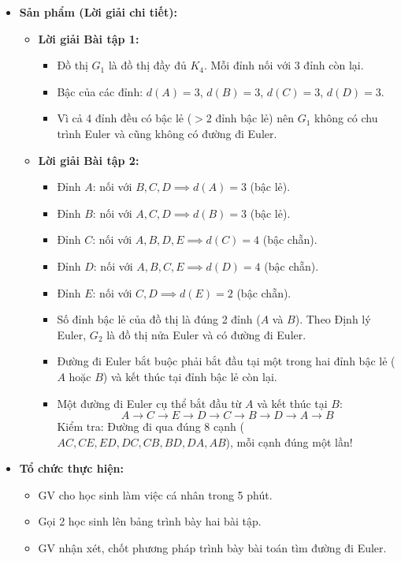 \documentclass[12pt, a4paper]{article}
\begin{document}
\begin{itemize}[leftmargin=1.2cm]
    \item[c)] \textbf{Sản phẩm (Lời giải chi tiết):}
    \begin{itemize}[leftmargin=0.6cm]
        \item \textbf{Lời giải Bài tập 1:}
        \begin{itemize}
            \item Đồ thị $G_1$ là đồ thị đầy đủ $K_4$. Mỗi đỉnh nối với 3 đỉnh còn lại.
            \item Bậc của các đỉnh: $d(A) = 3$, $d(B) = 3$, $d(C) = 3$, $d(D) = 3$.
            \item Vì cả 4 đỉnh đều có bậc lẻ ($> 2$ đỉnh bậc lẻ) nên $G_1$ không có chu trình Euler và cũng không có đường đi Euler.
        \end{itemize}
        \item \textbf{Lời giải Bài tập 2:}
        \begin{itemize}
            \item Đỉnh $A$: nối với $B, C, D \implies d(A) = 3$ (bậc lẻ).
            \item Đỉnh $B$: nối với $A, C, D \implies d(B) = 3$ (bậc lẻ).
            \item Đỉnh $C$: nối với $A, B, D, E \implies d(C) = 4$ (bậc chẵn).
            \item Đỉnh $D$: nối với $A, B, C, E \implies d(D) = 4$ (bậc chẵn).
            \item Đỉnh $E$: nối với $C, D \implies d(E) = 2$ (bậc chẵn).
            \item Số đỉnh bậc lẻ của đồ thị là đúng 2 đỉnh ($A$ và $B$). Theo Định lý Euler, $G_2$ là đồ thị nửa Euler và có đường đi Euler.
            \item Đường đi Euler bắt buộc phải bắt đầu tại một trong hai đỉnh bậc lẻ ($A$ hoặc $B$) và kết thúc tại đỉnh bậc lẻ còn lại.
            \item Một đường đi Euler cụ thể bắt đầu từ $A$ và kết thúc tại $B$:
            $$A \to C \to E \to D \to C \to B \to D \to A \to B$$
            Kiểm tra: Đường đi qua đúng 8 cạnh ($AC, CE, ED, DC, CB, BD, DA, AB$), mỗi cạnh đúng một lần!
        \end{itemize}
    \end{itemize}

    \item[d)] \textbf{Tổ chức thực hiện:}
    \begin{itemize}[leftmargin=0.6cm]
        \item GV cho học sinh làm việc cá nhân trong 5 phút.
        \item Gọi 2 học sinh lên bảng trình bày hai bài tập.
        \item GV nhận xét, chốt phương pháp trình bày bài toán tìm đường đi Euler.
    \end{itemize}
\end{itemize}
\end{document}
